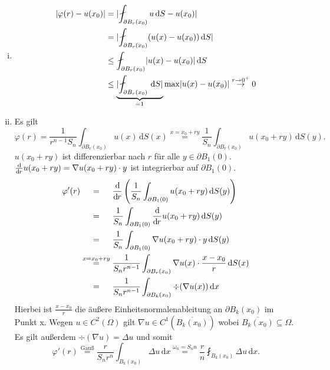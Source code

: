	\begin{beweis}
		\begin{enumerate}[(i)]
			\item \begin{align*}
				\abs{ \varphi(r)-u(x_0)} &= \abs{ \fint_{\partial B_r(x_0)}^{}u \,\mathrm{d}S - u(x_0)} \\
				&= \abs{ \fint_{\partial B_r(x_0)}^{} (u(x)-u(x_0)) \,\mathrm{d}S} \\
				& \leq \fint_{\partial B_r(x_0)}^{} \abs{u(x)-u(x_0)} \,\mathrm{d}S \\
				& \leq  \underset{=1}{\underbrace{\abs{\fint_{\partial B_r(x_0)}^{} \,\mathrm{d}S}}} \max \abs{u(x)-u(x_0)} \stackrel{r \to 0^+}{\to} 0
			\end{align*}
		\item Es gilt
		\begin{equation}
			\varphi(r) = \frac{1}{r^{n-1}S_n} \int_{\partial B_r(x_0)}^{}u(x) \,\mathrm{d}S(x) \stackrel{x=x_0 + r y}{=} \frac{1}{S_n} \int_{\partial B_r(x_0)}^{} u(x_0 + ry) \,\mathrm{d}S(y).
		\end{equation}
		$u(x_0 + ry)$ ist differenzierbar nach $r$ für alle $y \in \partial B_1(0)$. \\
		$\frac{\mathrm{d}\mkern-1.0mu }{\mathrm{d}\mkern-1.0mu r} u(x_0 + ry) =  \nabla u(x_0+ry) \cdot y$ ist integrierbar auf $ \partial B_1(0)$.
		\begin{align*}
			\varphi'(r) &\stackrel{\hphantom{x=x_0+ry}}{=} \frac{\mathrm{d}\mkern-1.0mu }{\mathrm{d}\mkern-1.0mu r}  \left( \frac{1}{S_n} \int_{\partial B_1(0)}^{} u(x_0 + ry) \,\mathrm{d}S(y) \right) \\
			& \stackrel{\hphantom{x=x_0+ry}}{=} \frac{1}{S_n} \int_{\partial B_1(0)}^{} \frac{\mathrm{d}\mkern-1.0mu }{\mathrm{d}\mkern-1.0mu r}  u(x_0 + ry) \,\mathrm{d}S(y) \\
			& \stackrel{\hphantom{x=x_0+ry}}{=} \frac{1}{S_n} \int_{\partial B_1(0)}^{} \nabla u(x_0 + r y) \cdot y \,\mathrm{d}S(y) \\
			& \stackrel{x=x_0+ry}{=} \frac{1}{S_n r^{n-1}} \int_{\partial B_r(x_0)}^{}  \nabla u(x) \cdot \frac{x-x_0}{r} \,\mathrm{d}S(x) \\
			&\stackrel{\hphantom{x=x_0+ry}}{=} \frac{1}{S_n r^{n-1}} \int_{\partial B_k(x_0)}^{} \div (  \nabla u(x)) \,\mathrm{d}x
		\end{align*}
		Hierbei ist $\frac{x-x_0}{r}$ die äußere Einheitsnormalenableitung an $\partial B_k(x_0)$ im Punkt x. 
		Wegen $u \in C^2(\Omega)$ gilt $ \nabla u \in C^1( \overline{B_k(x_0)})$ wobei $\overline{B_k(x_0)} \subseteq \Omega$. \\
		Es gilt außerdem $\div(  \nabla u) = \Delta u$ und somit
		\begin{equation}
			\varphi'(r) \stackrel{\text{Gauß}}{=} \frac{r}{S_n r^n} \int_{B_k(x_0)}^{} \Delta u \,\mathrm{d}x 
			\stackrel{\omega_n = S_n n}{=} \frac{r}{n} \fint_{B_k(x_0)}^{} \Delta u \,\mathrm{d}x.
		\end{equation}
		\end{enumerate}
		
	\end{beweis}
